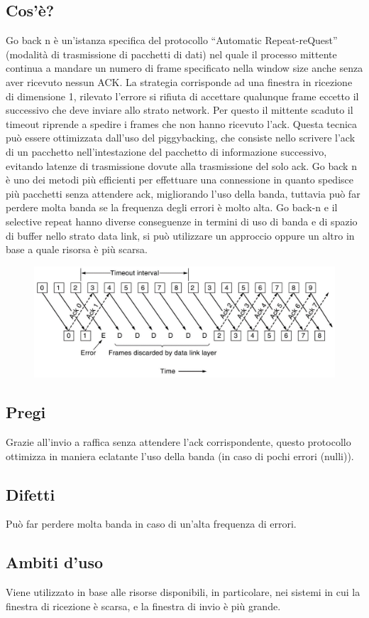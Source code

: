 \subsection{Cos'è?}
Go back n è un'istanza specifica del protocollo “Automatic Repeat-reQuest” (modalità di trasmissione di pacchetti di dati) nel quale il processo mittente continua a mandare un numero di frame specificato nella window size anche senza aver ricevuto nessun ACK.
La strategia corrisponde ad una finestra in ricezione di dimensione 1, rilevato l'errore si rifiuta di accettare qualunque frame eccetto il successivo che deve inviare allo strato network. Per questo il mittente scaduto il timeout riprende a spedire i frames che non hanno ricevuto l'ack.
Questa tecnica può essere ottimizzata dall'uso del piggybacking, che consiste nello scrivere l'ack di un pacchetto nell'intestazione del pacchetto di informazione successivo, evitando latenze di trasmissione dovute alla trasmissione del solo ack.
Go back n è uno dei metodi più efficienti per effettuare una connessione in quanto spedisce più pacchetti senza attendere ack, migliorando l'uso della banda, tuttavia può far perdere molta banda se la frequenza degli errori è molto alta.
Go back-n e il selective repeat hanno diverse conseguenze in termini di uso di banda e di spazio di buffer nello strato data link, si può utilizzare un approccio oppure un altro in base a quale risorsa è più scarsa.

\begin{figure}[H]
\centering
\includegraphics[scale=0.9]{res/img/20_GoBackN.png}
\end{figure}

\subsection{Pregi}
Grazie all'invio a raffica senza attendere l'ack corrispondente, questo protocollo ottimizza in maniera eclatante l'uso della banda (in caso di pochi errori (nulli)).

\subsection{Difetti}
Può far perdere molta banda in caso di un'alta frequenza di errori.

\subsection{Ambiti d'uso}
Viene utilizzato in base alle risorse disponibili, in particolare, nei sistemi in cui la finestra di ricezione è scarsa, e la finestra di invio è più grande.
